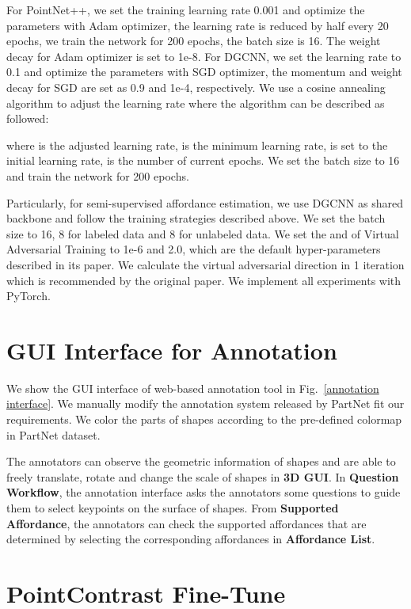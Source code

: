 \documentclass[final]{cvpr}
\begin{document}
For PointNet++, we set the training learning rate 0.001 and optimize the parameters with Adam optimizer, the learning rate is reduced by half every 20 epochs, we train the network for 200 epochs, the batch size is 16. The weight decay for Adam optimizer is set to 1e-8. For DGCNN, we set the learning rate to  0.1 and optimize the parameters with SGD optimizer, the momentum and weight decay for SGD are set as 0.9 and 1e-4, respectively. We use a cosine annealing algorithm to adjust the learning rate where the algorithm can be described as followed:

where  is the adjusted learning rate,  is the minimum learning rate,  is set to the initial learning rate,  is the number of current epochs. We set the batch size to 16 and train the network for 200 epochs. 

Particularly, for semi-supervised affordance estimation, we use DGCNN as shared backbone and follow the training strategies described above. We set the batch size to 16, 8 for labeled data and 8 for unlabeled data. We set the  and  of Virtual Adversarial Training to 1e-6 and 2.0, which are the default hyper-parameters described in its paper. We calculate the virtual adversarial direction in 1 iteration which is recommended by the original paper. We implement all experiments with PyTorch.



\section{GUI Interface for Annotation} \label{gui interface}

We show the GUI interface of web-based annotation tool in Fig.~\ref{annotation interface}. We manually modify the annotation system released by PartNet fit our requirements. We color the parts of shapes according to the pre-defined colormap in PartNet dataset. 

The annotators can observe the geometric information of shapes and are able to freely translate, rotate and change the scale of shapes in \textbf{3D GUI}. In \textbf{Question Workflow}, the annotation interface asks the annotators some questions to guide them to select keypoints on the surface of shapes. From \textbf{Supported Affordance}, the annotators can check the supported affordances that are determined by selecting the corresponding affordances in \textbf{Affordance List}. 

\section{PointContrast Fine-Tune} \label{pc finetune}
\end{document}
